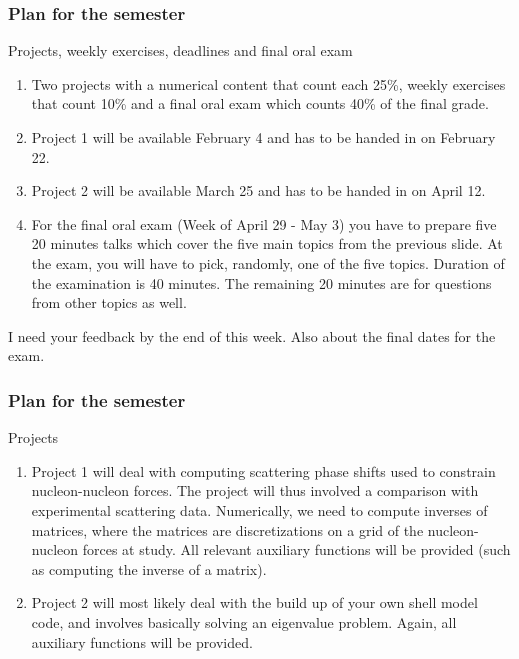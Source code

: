 \documentclass[compress]{beamer}
\begin{document}
\frame
{
  \frametitle{Plan for the semester}
  \begin{block}{Projects, weekly exercises, deadlines and final oral exam}
\begin{enumerate}
\item Two  projects with a numerical content that count each 25\%, weekly exercises  that count 10\% and a final oral exam which counts 40\% of the final grade. 
\item Project 1 will be available February 4 and has to be handed in on February 22.
\item Project 2 will be available March 25 and has to be handed in on April 12. 
\item For the final oral exam (Week of April 29 - May 3) you have to prepare five 20 minutes talks which cover the five main topics from the previous slide. At the exam, you will have to pick, randomly, one of the five topics.
Duration of the examination is 40 minutes. The remaining 20 minutes are for questions from other topics as well. 
\end{enumerate}
I need your feedback by the end of this week. Also about the final dates for the exam.
  \end{block}
} 


\frame
{
  \frametitle{Plan for the semester}
  \begin{block}{Projects}
\begin{enumerate}
\item Project 1 will deal with computing scattering phase shifts used to constrain nucleon-nucleon forces. The project will thus involved a comparison with experimental scattering data. Numerically, we need to compute inverses of matrices, where the matrices are discretizations on a grid of the nucleon-nucleon forces at study. All relevant auxiliary functions will be provided (such as computing the inverse of a matrix).
\item Project 2 will most likely deal with the build up of your own shell model code, and involves basically solving an eigenvalue problem. Again, all auxiliary functions will be provided.
\end{enumerate}
  \end{block}
} 
\end{document}
